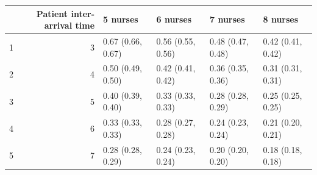 \begin{table}[ht]
\centering
\begin{tabular}{rrllll}
  \hline
 & Patient inter-arrival time & 5 nurses & 6 nurses & 7 nurses & 8 nurses \\ 
  \hline
1 &   3 & 0.67 (0.66, 0.67) & 0.56 (0.55, 0.56) & 0.48 (0.47, 0.48) & 0.42 (0.41, 0.42) \\ 
  2 &   4 & 0.50 (0.49, 0.50) & 0.42 (0.41, 0.42) & 0.36 (0.35, 0.36) & 0.31 (0.31, 0.31) \\ 
  3 &   5 & 0.40 (0.39, 0.40) & 0.33 (0.33, 0.33) & 0.28 (0.28, 0.29) & 0.25 (0.25, 0.25) \\ 
  4 &   6 & 0.33 (0.33, 0.33) & 0.28 (0.27, 0.28) & 0.24 (0.23, 0.24) & 0.21 (0.20, 0.21) \\ 
  5 &   7 & 0.28 (0.28, 0.29) & 0.24 (0.23, 0.24) & 0.20 (0.20, 0.20) & 0.18 (0.18, 0.18) \\ 
   \hline
\end{tabular}
\end{table}
